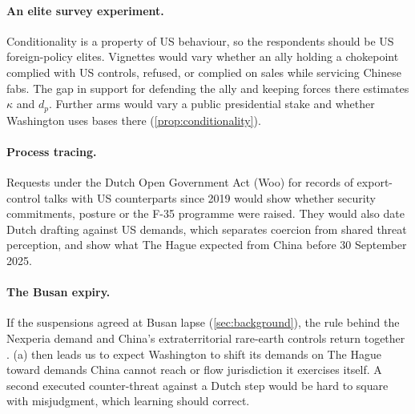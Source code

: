 \paragraph{An elite survey experiment.} Conditionality is a property of US behaviour, so the respondents should be US foreign-policy elites. Vignettes would vary whether an ally holding a chokepoint complied with US controls, refused, or complied on sales while servicing Chinese fabs. The gap in support for defending the ally and keeping forces there estimates $\kappa$ and $d_p$. Further arms would vary a public presidential stake and whether Washington uses bases there (\cref{prop:conditionality}).

\paragraph{Process tracing.} Requests under the Dutch Open Government Act (Woo) for records of export-control talks with US counterparts since 2019 would show whether security commitments, posture or the F-35 programme were raised. They would also date Dutch drafting against US demands, which separates coercion from shared threat perception, and show what The Hague expected from China before 30 September 2025.

\paragraph{The Busan expiry.} If the suspensions agreed at Busan lapse (\cref{sec:background}), the rule behind the Nexperia demand and China's extraterritorial rare-earth controls return together \citep{bis2025affiliates, mofcom2025pause}. (a) then leads us to expect Washington to shift its demands on The Hague toward demands China cannot reach or flow jurisdiction it exercises itself. A second executed counter-threat against a Dutch step would be hard to square with misjudgment, which learning should correct.
